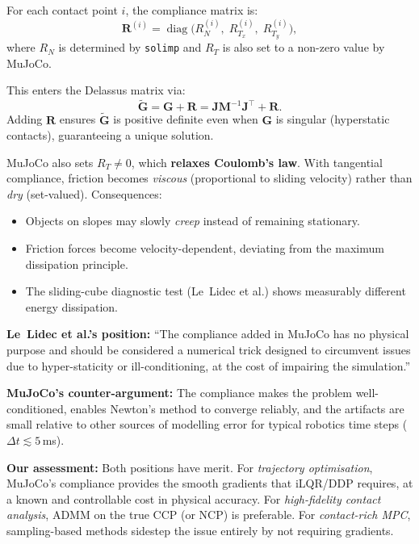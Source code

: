\documentclass[11pt,twoside]{report}
\theoremstyle{definition}
\theoremstyle{plain}
\theoremstyle{remark}
\newcommand{\0}{\bm{0}}
\newcommand{\M}{\bm{M}}
\newcommand{\J}{\bm{J}}
\DeclareMathOperator{\diag}{diag}
\begin{document}
For each contact point $i$, the compliance matrix is:
\begin{equation}
\bm{R}^{(i)}=\diag\bigl(R_{N}^{(i)},\;R_{T_{x}}^{(i)},\;R_{T_{y}}^{(i)}\bigr),
\end{equation}
where $R_{N}$ is determined by \texttt{solimp} and $R_{T}$ is also set to a non-zero value by MuJoCo.

This enters the Delassus matrix via:
\begin{equation}
\tilde{\bm{G}}=\bm{G}+\bm{R}=\J\M^{-1}\J^{\!\top}+\bm{R}.
\end{equation}
Adding $\bm{R}$ ensures $\tilde{\bm{G}}$ is positive definite even when $\bm{G}$
is singular (hyperstatic contacts), guaranteeing a unique solution.

\begin{warningbox}
MuJoCo also sets $R_{T}\ne 0$, which \textbf{relaxes Coulomb's law}.
With tangential compliance, friction becomes \emph{viscous} (proportional to
sliding velocity) rather than \emph{dry} (set-valued).
Consequences:
\begin{itemize}
\item Objects on slopes may slowly \emph{creep} instead of remaining stationary.
\item Friction forces become velocity-dependent, deviating from the maximum dissipation principle.
\item The sliding-cube diagnostic test (Le~Lidec et al.) shows measurably different energy dissipation.
\end{itemize}

\textbf{Le~Lidec et al.'s position:} ``The compliance added in MuJoCo has no physical purpose and should be considered a numerical trick designed to circumvent issues due to hyper-staticity or ill-conditioning, at the cost of impairing the simulation.''

\textbf{MuJoCo's counter-argument:} The compliance makes the problem well-conditioned, enables Newton's method to converge reliably, and the artifacts are small relative to other sources of modelling error for typical robotics time steps ($\Delta t\lesssim 5$\,ms).

\textbf{Our assessment:} Both positions have merit.  For \emph{trajectory optimisation}, MuJoCo's compliance provides the smooth gradients that iLQR/DDP requires, at a known and controllable cost in physical accuracy.  For \emph{high-fidelity contact analysis}, ADMM on the true CCP (or NCP) is preferable.  For \emph{contact-rich MPC}, sampling-based methods sidestep the issue entirely by not requiring gradients.
\end{warningbox}
\end{document}
